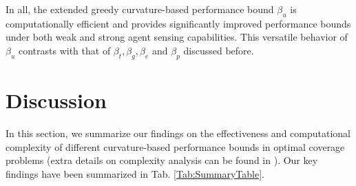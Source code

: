 \documentclass[letterpaper, 10 pt, conference]{ieeeconf}
\begin{document}

In all, the extended greedy curvature-based performance bound $\beta_u$ is computationally efficient and provides significantly improved performance bounds under both weak and strong agent sensing capabilities. This versatile behavior of $\beta_u$ contrasts with that of $\beta_t,\beta_g,\beta_e$ and $\beta_p$ discussed before. 

\vspace{-2mm}
\section{Discussion}\label{Sec:Discussion}




In this section, we summarize our findings on the effectiveness and computational complexity of different curvature-based performance bounds in optimal coverage problems (extra details on complexity analysis can be found in \cite{Welikala2024Ax1}). Our key findings have been summarized in Tab. \ref{Tab:SummaryTable}.  


\end{document}
